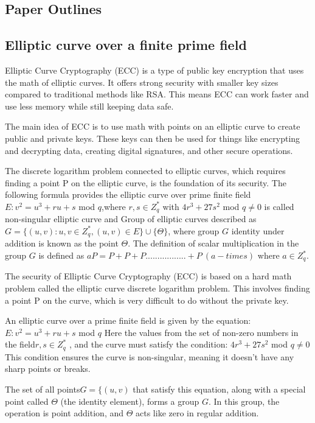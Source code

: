 \documentclass[3p,times,onecolumn]{elsarticle}
\begin{document}
\subsection{\textbf{Paper Outlines}}








\subsection{\textbf{Elliptic curve over a finite prime field }}


Elliptic Curve Cryptography (ECC) is a type of public key encryption that uses the math of elliptic curves. It offers strong security with smaller key sizes compared to traditional methods like RSA. This means ECC can work faster and use less memory while still keeping data safe.

The main idea of ECC is to use math with points on an elliptic curve to create public and private keys. These keys can then be used for things like encrypting and decrypting data, creating digital signatures, and other secure operations.

The discrete logarithm problem connected to elliptic curves, which requires finding a point P on the elliptic curve, is the foundation of its security.
The following formula provides the elliptic curve over prime finite field $E: v^2=u^3+ru+s$ mod $q$,where $r,s\in Z_{q}^{*}$ with $4r^3+27s^2$ mod $q\neq0$ is called non-singular elliptic curve and Group of elliptic curves described as $G=\{(u,v): u,v\in Z_{q}^{*}, (u,v)\in E\}\cup \{\Theta\}$, where group $G$ identity under addition is known as the point $\Theta$. The definition of scalar multiplication in the group $G$ is defined as $aP=P+P+P.................+P~(a-times)$ where $a\in Z_{q}^{*}$.


The security of Elliptic Curve Cryptography (ECC) is based on a hard math problem called the elliptic curve discrete logarithm problem. This involves finding a point P on the curve, which is very difficult to do without the private key.

An elliptic curve over a prime finite field is given by the equation:
$E: v^2=u^3+ru+s$ mod $q$
Here the values from the set of non-zero numbers in the field$r,s\in Z_{q}^{*}$ , and the curve must satisfy the condition:
$4r^3+27s^2$ mod $q\neq0$
This condition ensures the curve is non-singular, meaning it doesn’t have any sharp points or breaks.

The set of all points$G=\{(u,v)$ that satisfy this equation, along with a special point called $\Theta$ (the identity element), forms a group $G$. In this group, the operation is point addition, and $\Theta$ acts like zero in regular addition.
\end{document}
